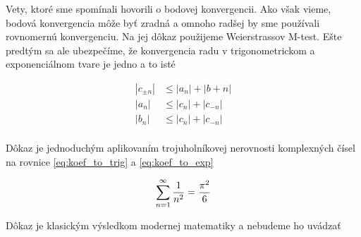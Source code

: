 
Vety, ktoré sme spomínali hovorili o bodovej konvergencii. Ako však
vieme, bodová konvergencia môže byť zradná a omnoho radšej by
sme používali rovnomernú konvergenciu. Na jej dôkaz použijeme
Weierstrassov M-test. Ešte predtým sa ale ubezpečíme, že
konvergencia radu v trigonometrickom a exponenciálnom tvare je jedno a
to isté
\begin{lema}
   \begin{align}
    |c_{\pm n}| &\le |a_n| + |b+n| \\
    |a_n| &\le |c_n| + |c_{-n}| \\
    |b_n| &\le |c_n| + |c_{-n}| \\    
   \end{align}
   \label{lema:konv_mtest_tring_exp_equiv}
\end{lema}
\begin{dokaz}
    Dôkaz je jednoduchým aplikovaním trojuholníkovej nerovnosti
    komplexných čísel na rovnice \eqref{eq:koef_to_trig}
    a \eqref{eq:koef_to_exp}
\end{dokaz}

\begin{lema}
    \begin{equation}
        \sum_{n=1}^{\infty} \frac{1}{n^2} = \frac{\pi^2}{6}
    \end{equation}
    \label{lema:sum_nn}
\end{lema}
\begin{dokaz}
    Dôkaz je klasickým výsledkom modernej matematiky a nebudeme ho
    uvádzať
\end{dokaz}

